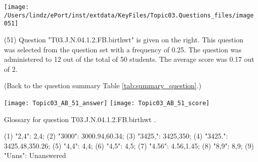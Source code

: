 \documentclass[12pt,english,nohyper]{tufte-handout}\usepackage[]{graphicx}\usepackage[]{color}
\begin{document}
\vspace{6cm}\begin{marginfigure}\texttt{[image: /Users/lindz/ePort/inst/extdata/KeyFiles/Topic03.Questions\_files/image051]}\end{marginfigure}\vspace{-6cm} (51) Question "T03.J.N.04.1.2.FB.birthwt" is given on the right. This question was selected from the question set with a frequency of 0.25. The question was administered to 12 out of the total of 50 students. The average score was 0.17 out of 2.

 (Back to the question summary Table \ref{tab:summary_question}.)

\begin{center} \texttt{[image: Topic03\_AB\_51\_answer]} \texttt{[image: Topic03\_AB\_51\_score]} \end{center} 

Glossary for question T03.J.N.04.1.2.FB.birthwt .

(1) "2,4": 2,4; (2) "3000": 3000.94,60.34; (3) "3425,": 3425,350; (4) "3425.": 3425.48,350.26; (5) "4,4": 4,4; (6) "4,5": 4,5; (7) "4.56": 4.56,1.45; (8) "8,9": 8,9; (9) "Unns": Unanswered
\end{document}
